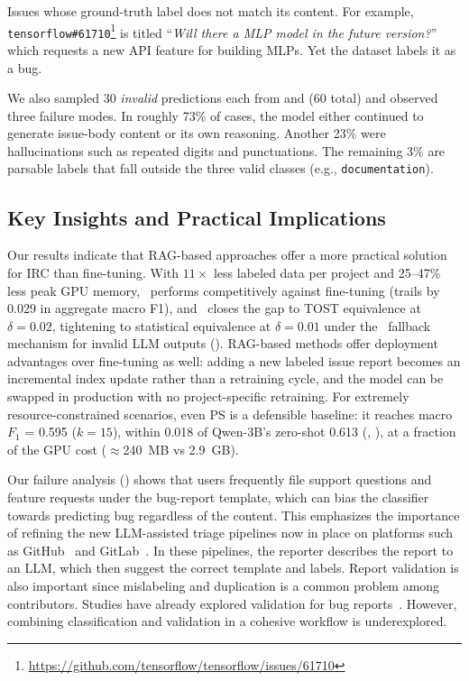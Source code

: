  Issues whose ground-truth label does not match its content. For example, \texttt{tensorflow\#61710}\footnote{\url{https://github.com/tensorflow/tensorflow/issues/61710}} is titled ``\textit{Will there a MLP model in the future version?}'' which requests a new API feature for building MLPs. Yet the dataset labels it as a bug.

We also sampled 30 \textit{invalid} predictions each from \ragtag and \bragtag (60 total) and observed three failure modes. In roughly 73\% of cases, the model either continued to generate issue-body content or its own reasoning. Another 23\% were hallucinations such as repeated digits and punctuations. The remaining 3\% are parsable labels that fall outside the three valid classes (e.g., \texttt{documentation}).


\subsection{Key Insights and Practical Implications}
\label{sec:disc-insights}

 Our results indicate that RAG-based approaches offer a more practical solution for IRC than fine-tuning. With $11\times$ less labeled data per project and 25--47\% less peak GPU memory, \ragtag\ performs competitively against fine-tuning (trails by 0.029 in aggregate macro F1), and \bragtag\ closes the gap to TOST equivalence at $\delta{=}0.02$, tightening to statistical equivalence at $\delta{=}0.01$ under the \votag\ fallback mechanism for invalid LLM outputs (). RAG-based methods offer deployment advantages over fine-tuning as well: adding a new labeled issue report becomes an incremental index update rather than a retraining cycle, and the model can be swapped in production with no project-specific retraining. For extremely resource-constrained scenarios, even \votag PS is a defensible baseline: it reaches macro $F_1$ = 0.595 ($k{=}15$), within 0.018 of Qwen-3B's zero-shot 0.613 (, ), at a fraction of the GPU cost ($\approx$240~MB vs 2.9~GB).

 Our failure analysis () shows that users frequently file support questions and feature requests under the bug-report template, which can bias the classifier towards predicting bug regardless of the content. This emphasizes the importance of refining the new LLM-assisted triage pipelines now in place on platforms such as GitHub~\cite{githubcopilot} and GitLab~\cite{gitlabduo}. In these pipelines, the reporter describes the report to an LLM, which then suggest the correct template and labels. Report validation is also important since mislabeling and duplication is a common problem among contributors\cite{antoniol2008bug, pandey2017automated}. Studies have already explored validation for bug reports~\cite{khatib2025assertflip, wang2024aegis, ahmed2025otter, dincc2025judge}. However, combining classification and validation in a cohesive workflow is underexplored.

